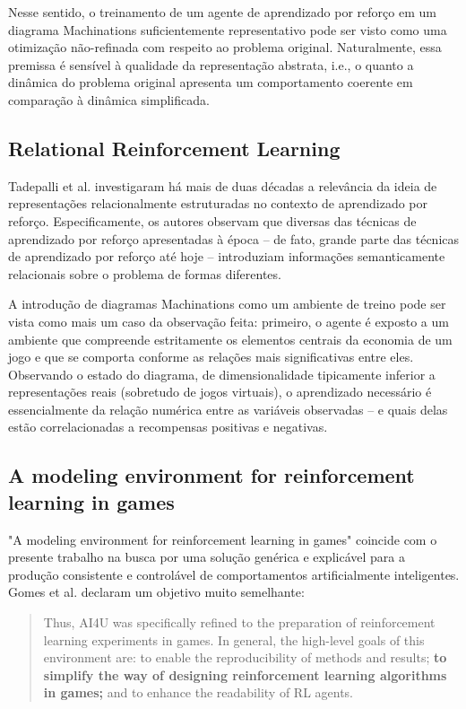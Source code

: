 \documentclass[conference]{IEEEtran}
\begin{document}
Nesse sentido, o treinamento de um agente de aprendizado por reforço em um diagrama Machinations suficientemente representativo pode ser visto como uma otimização não-refinada com respeito ao problema original. Naturalmente, essa premissa é sensível à qualidade da representação abstrata, i.e., o quanto a dinâmica do problema original apresenta um comportamento coerente em comparação à dinâmica simplificada.

\subsection{Relational Reinforcement Learning}
Tadepalli et al. \cite{rrl} investigaram há mais de duas décadas a relevância da ideia de representações relacionalmente estruturadas no contexto de aprendizado por reforço. Especificamente, os autores observam que diversas das técnicas de aprendizado por reforço apresentadas à época -- de fato, grande parte das técnicas de aprendizado por reforço até hoje -- introduziam informações semanticamente relacionais sobre o problema de formas diferentes.

A introdução de diagramas Machinations como um ambiente de treino pode ser vista como mais um caso da observação feita: primeiro, o agente é exposto a um ambiente que compreende estritamente os elementos centrais da economia de um jogo e que se comporta conforme as relações mais significativas entre eles. Observando o estado do diagrama, de dimensionalidade tipicamente inferior a representações reais (sobretudo de jogos virtuais), o aprendizado necessário é essencialmente da relação numérica entre as variáveis observadas -- e quais delas estão correlacionadas a recompensas positivas e negativas.

\subsection{A modeling environment for reinforcement learning in games}
"A modeling environment for reinforcement learning in games" coincide com o presente trabalho na busca por uma solução genérica e explicável para a produção consistente e controlável de comportamentos artificialmente inteligentes. Gomes et al.\cite{modeling-rl-games} declaram um objetivo muito semelhante:
\begin{quote}
    Thus, AI4U was specifically refined to the preparation of reinforcement learning experiments in games. In general, the high-level goals of this environment are: to enable the reproducibility of methods and results; \textbf{to simplify the way of designing reinforcement learning algorithms in games;} and to enhance the readability of RL agents.
\end{quote}
\end{document}
